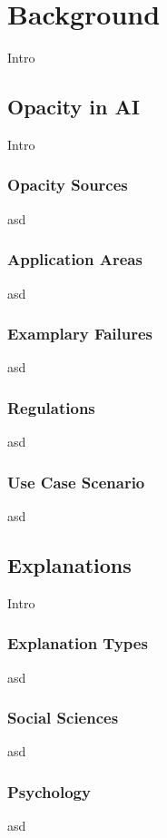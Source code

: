 \section{Background}

Intro


\subsection{Opacity in AI}
Intro

\subsubsection{Opacity Sources}
asd

\subsubsection{Application Areas}
asd

\subsubsection{Examplary Failures}
asd

\subsubsection{Regulations}
asd

\subsubsection{Use Case Scenario}
asd



\subsection{Explanations}
Intro

\subsubsection{Explanation Types}
asd

\subsubsection{Social Sciences}
asd

\subsubsection{Psychology}
asd




